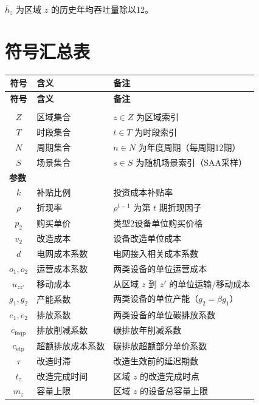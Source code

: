 \documentclass[12pt,a4paper]{article}
\newcommand{\手批注}[2]{\textcolor{#1}{\text{\kaishu #2}}}
\newcommand{\一阶段}{\textcolor{firststage}{\text{\kaishu （一阶段）}}}
\newcommand{\二阶段}{\textcolor{secondstage}{\text{\kaishu （二阶段）}}}
\begin{document}
$\bar{h}_z$ 为区域 $z$ 的历史年均吞吐量除以12。

\newpage
\section{符号汇总表}

\begin{footnotesize}
\renewcommand{\arraystretch}{1.15}
\begin{longtable}{clp{7.5cm}}
\toprule
\textbf{符号} & \textbf{含义} & \textbf{备注} \\
\midrule
\endfirsthead
\toprule
\textbf{符号} & \textbf{含义} & \textbf{备注} \\
\midrule
\endhead
\bottomrule
\endfoot
\multicolumn{3}{l}{\textbf{集合}} \\
$Z$ & 区域集合 & $z \in Z$ 为区域索引 \\
$T$ & 时段集合 & $t \in T$ 为时段索引 \\
$N$ & 周期集合 & $n \in N$ 为年度周期（每周期12期） \\
$S$ & 场景集合 & $s \in S$ 为随机场景索引（SAA采样） \\
\midrule
\multicolumn{3}{l}{\textbf{参数}} \\
$k$ & 补贴比例 & 投资成本补贴率 \\
$\rho$ & 折现率 & $\rho^{t-1}$ 为第 $t$ 期折现因子 \\
$p_2$ & 购买单价 & 类型2设备单位购买价格 \\
$v_2$ & 改造成本 & 设备改造单位成本 \\
$d$ & 电网成本系数 & 电网接入相关成本系数 \\
$o_1, o_2$ & 运营成本系数 & 两类设备的单位运营成本 \\
$u_{zz'}$ & 移动成本 & 从区域 $z$ 到 $z'$ 的单位运输/移动成本 \\
$g_1, g_2$ & 产能系数 & 两类设备的单位产能（$g_2 = \beta g_1$） \\
$e_1, e_2$ & 排放系数 & 两类设备的单位碳排放系数 \\
$c_{\text{feqp}}$ & 排放削减系数 & 碳排放年削减系数 \\
$c_{\text{etp}}$ & 超额排放成本系数 & 碳排放超额部分单价系数 \\
$\tau$ & 改造时滞 & 改造生效前的延迟期数 \\
$t_z$ & 改造完成时间 & 区域 $z$ 的改造完成时点 \\
$m_z$ & 容量上限 & 区域 $z$ 的设备总容量上限 \\

\end{longtable}
\end{footnotesize}
\end{document}
